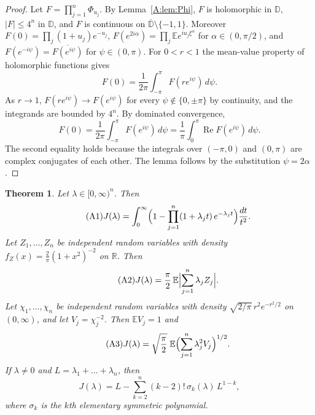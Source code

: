 \documentclass[11pt]{amsart}
\newtheorem{theorem}{Theorem}[section]
\theoremstyle{remark}
\numberwithin{equation}{section}
\newcommand{\R}{\mathbb{R}}
\newcommand{\E}{\mathbb{E}}
\begin{document}
\begin{proof}
Let $F=\prod_{j=1}^n\Phi_{u_j}$. By Lemma~\ref{A:lem:Phi}, $F$ is holomorphic in $\mathbb D$, $|F|\le4^n$ in $\mathbb D$, and $F$ is continuous on $\overline{\mathbb D}\setminus\{-1,1\}$. Moreover $F(0)=\prod_j(1+u_j)e^{-u_j}$, $F(e^{2i\alpha})=\prod_j\E e^{iu_j\xi^\alpha}$ for $\alpha\in(0,\pi/2)$, and $F(e^{-i\psi})=\overline{F(e^{i\psi})}$ for $\psi\in(0,\pi)$. For $0<r<1$ the mean-value property of holomorphic functions gives
\[
F(0)=\frac1{2\pi}\int_{-\pi}^{\pi}F(re^{i\psi})\,d\psi.
\]
As $r\to1$, $F(re^{i\psi})\to F(e^{i\psi})$ for every $\psi\notin\{0,\pm\pi\}$ by continuity, and the integrands are bounded by $4^n$. By dominated convergence,
\[
F(0)=\frac1{2\pi}\int_{-\pi}^{\pi}F(e^{i\psi})\,d\psi=\frac1\pi\int_0^\pi\operatorname{Re}F(e^{i\psi})\,d\psi.
\]
The second equality holds because the integrals over $(-\pi,0)$ and $(0,\pi)$ are complex conjugates of each other. The lemma follows by the substitution $\psi=2\alpha$.
\end{proof}

\begin{theorem}\label{A:thm:A}
Let $\lambda\in[0,\infty)^n$. Then
\begin{equation*}\tag{A1}\label{A:eq:A1}
J(\lambda)=\int_0^\infty\Bigl(1-\prod_{j=1}^n(1+\lambda_jt)\,e^{-\lambda_jt}\Bigr)\frac{dt}{t^2}.
\end{equation*}
Let $Z_1,\dots,Z_n$ be independent random variables with density $f_Z(x)=\frac2\pi(1+x^2)^{-2}$ on $\R$. Then
\begin{equation*}\tag{A2}\label{A:eq:A2}
J(\lambda)=\frac\pi2\,\E\Bigl|\sum_{j=1}^n\lambda_jZ_j\Bigr|.
\end{equation*}
Let $\chi_1,\dots,\chi_n$ be independent random variables with density $\sqrt{2/\pi}\,r^2e^{-r^2/2}$ on $(0,\infty)$, and let $V_j=\chi_j^{-2}$. Then $\E V_j=1$ and
\begin{equation*}\tag{A3}\label{A:eq:A3}
J(\lambda)=\sqrt{\frac\pi2}\;\E\Bigl(\sum_{j=1}^n\lambda_j^2V_j\Bigr)^{1/2}.
\end{equation*}
If $\lambda\ne0$ and $L=\lambda_1+\dots+\lambda_n$, then
\begin{equation*}\tag{A4}\label{A:eq:A4}
J(\lambda)=L-\sum_{k=2}^n(k-2)!\,\sigma_k(\lambda)\,L^{1-k},
\end{equation*}
where $\sigma_k$ is the $k$th elementary symmetric polynomial.
\end{theorem}
\end{document}
